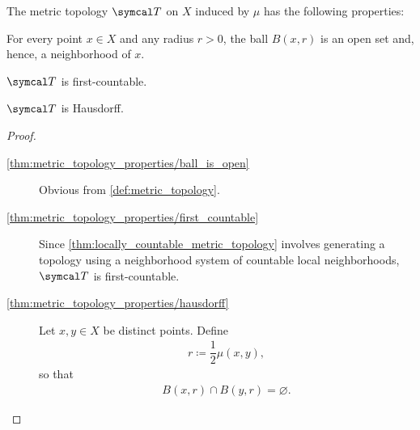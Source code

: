 \begin{proposition}\label{thm:metric_topology_properties}
  The metric topology $\Cal{T}$ on $X$ induced by $\mu$ has the following properties:
  \begin{defenum}
    \item\label{thm:metric_topology_properties/ball_is_open} For every point $x \in X$ and any radius $r > 0$, the ball $B(x, r)$ is an open set and, hence, a neighborhood of $x$.
    \item\label{thm:metric_topology_properties/first_countable} $\Cal{T}$ is first-countable.
    \item\label{thm:metric_topology_properties/hausdorff} $\Cal{T}$ is Hausdorff.
  \end{defenum}
\end{proposition}
\begin{proof}
  \begin{description}
    \item[\ref{thm:metric_topology_properties/ball_is_open}] Obvious from \cref{def:metric_topology}.

    \item[\ref{thm:metric_topology_properties/first_countable}] Since \cref{thm:locally_countable_metric_topology} involves generating a topology using a neighborhood system of countable local neighborhoods, $\Cal{T}$ is first-countable.

    \item[\ref{thm:metric_topology_properties/hausdorff}] Let $x, y \in X$ be distinct points. Define
    \begin{align*}
      r \coloneqq \dfrac 1 2 \mu(x, y),
    \end{align*}
    so that
    \begin{align*}
      B(x, r) \cap B(y, r) = \varnothing.
    \end{align*}
  \end{description}
\end{proof}

